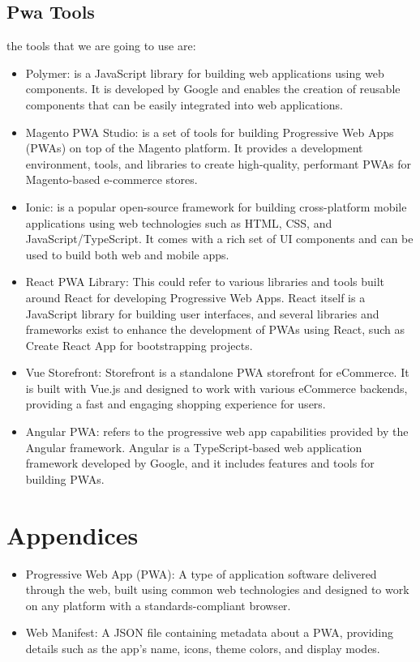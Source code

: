 \documentclass[12pt,a4paper, twosite]{article}
\begin{document}
\subsection{Pwa Tools}
\label{sec:orgb8b6b9e}
the tools that we are going to use are:
\begin{itemize}
  \item Polymer: is a JavaScript library for building web applications using web components. It is developed by Google and enables the creation of reusable components that can be easily integrated into web applications.
  
  \item Magento PWA Studio: is a set of tools for building Progressive Web Apps (PWAs) on top of the Magento platform. It provides a development environment, tools, and libraries to create high-quality, performant PWAs for Magento-based e-commerce stores.
  
  \item Ionic: is a popular open-source framework for building cross-platform mobile applications using web technologies such as HTML, CSS, and JavaScript/TypeScript. It comes with a rich set of UI components and can be used to build both web and mobile apps.
  
  \item React PWA Library: This could refer to various libraries and tools built around React for developing Progressive Web Apps. React itself is a JavaScript library for building user interfaces, and several libraries and frameworks exist to enhance the development of PWAs using React, such as Create React App for bootstrapping projects.
  
  \item Vue Storefront: Storefront is a standalone PWA storefront for eCommerce. It is built with Vue.js and designed to work with various eCommerce backends, providing a fast and engaging shopping experience for users.
  
  \item Angular PWA: refers to the progressive web app capabilities provided by the Angular framework. Angular is a TypeScript-based web application framework developed by Google, and it includes features and tools for building PWAs.

\end{itemize}



\newpage
\section{Appendices}
\label{sec:org75cea03}

\begin{itemize}
  \item Progressive Web App (PWA): A type of application software delivered through the web, built using common web technologies and designed to work on any platform with a standards-compliant browser.
  
  \item Web Manifest: A JSON file containing metadata about a PWA, providing details such as the app's name, icons, theme colors, and display modes.
  
\end{itemize}
\end{document}
